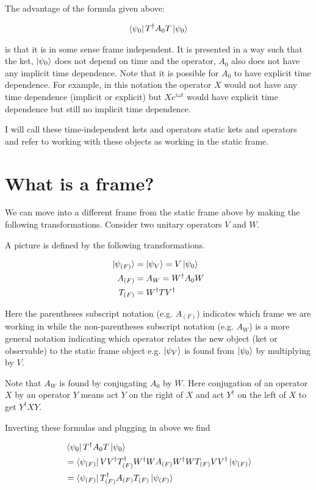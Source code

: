 \documentclass[12pt]{article}
\begin{document}
The advantage of the formula given above:

\begin{align}
\bra{\psi_0}T^{\dag}A_0T\ket{\psi_0}
\end{align}

is that it is in some sense frame independent. It is presented in a way such that the ket, $\ket{\psi_0}$ does not depend on time and the operator, $A_0$ also does not have any implicit time dependence. Note that it is possible for $A_0$ to have explicit time dependence. For example, in this notation the operator $X$ would not have any time dependence (implicit or explicit) but $X e^{i\omega t}$ would have explicit time dependence but still no implicit time dependence.

I will call these time-independent kets and operators static kets and operators and refer to working with these objects as working in the static frame.

\section{What is a frame?}

We can move into a different frame from the static frame  above by making the following transformations. Consider two unitary operators $V$ and $W$.

A picture is defined by the following transformations.

\begin{align}
\ket{\psi_{(F)}} &= \ket{\psi_V} = V \ket{\psi_0}\\
A_{(F)} &= A_W = W^{\dag}A_0 W\\
T_{(F)} &= W^{\dag} T V^{\dag}
\end{align}

Here the parentheses subscript notation (e.g. $A_{(F)}$) indicates which frame we are working in while the non-parentheses subscript notation (e.g. $A_W$) is a more general notation indicating which operator relates the new object (ket or observable) to the static frame object e.g. $\ket{\psi_V}$ is found from $\ket{\psi_0}$ by multiplying by $V$.

Note that $A_W$ is found by conjugating $A_0$ by $W$. Here conjugation of an operator $X$ by an operator $Y$ means act $Y$ on the right of $X$ and act $Y^{\dag}$ on the left of $X$ to get $Y^{\dag}XY$.

Inverting these formulas and plugging in above we find

\begin{align}
&\bra{\psi_0} T^{\dag}A_0 T \ket{\psi_0}\\
&= \bra{\psi_{(F)}} V V^{\dag}T_{(F)}^{\dag}W^{\dag} W A_{(F)} W^{\dag} W T_{(F)} V V^{\dag}\ket{\psi_{(F)}}\\
&= \bra{\psi_{(F)}} T_{(F)}^{\dag} A_{(F)} T_{(F)} \ket{\psi_{(F)}}
\end{align}
\end{document}
